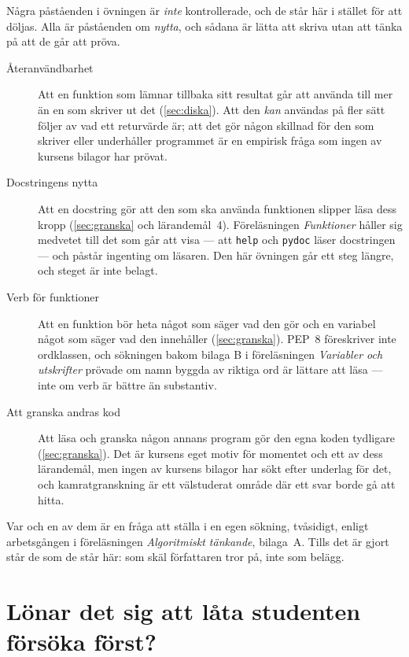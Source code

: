 Några påståenden i övningen är \emph{inte} kontrollerade, och de står
här i stället för att döljas.  Alla är påståenden om \emph{nytta}, och
sådana är lätta att skriva utan att tänka på att de går att pröva.
\begin{description}
  \item[Återanvändbarhet] Att en funktion som lämnar tillbaka sitt
    resultat går att använda till mer än en som skriver ut det
    (\cref{sec:diska}).  Att den \emph{kan} användas på fler sätt följer
    av vad ett returvärde är; att det gör någon skillnad för den som
    skriver eller underhåller programmet är en empirisk fråga som ingen
    av kursens bilagor har prövat.
  \item[Docstringens nytta] Att en docstring gör att den som ska använda
    funktionen slipper läsa dess kropp (\cref{sec:granska}
    och lärandemål~4).
    Föreläsningen \emph{Funktioner} håller sig medvetet till det som går
    att visa --- att \texttt{help} och \texttt{pydoc} läser
    docstringen --- och påstår ingenting om läsaren.  Den här övningen
    går ett steg längre, och steget är inte belagt.
  \item[Verb för funktioner] Att en funktion bör heta något som säger
    vad den gör och en variabel något som säger vad den innehåller
    (\cref{sec:granska}).  PEP~8 föreskriver inte ordklassen, och
    sökningen bakom bilaga B i föreläsningen \emph{Variabler och
    utskrifter} prövade om namn byggda av riktiga ord är lättare att
    läsa --- inte om verb är bättre än substantiv.
  \item[Att granska andras kod] Att läsa och granska någon annans
    program gör den egna koden tydligare (\cref{sec:granska}).  Det är
    kursens eget motiv för momentet och ett av dess lärandemål, men
    ingen av kursens bilagor har sökt efter underlag för det, och
    kamratgranskning är ett välstuderat område där ett svar borde gå att
    hitta.
\end{description}
Var och en av dem är en fråga att ställa i en egen sökning, tvåsidigt,
enligt arbetsgången i föreläsningen \emph{Algoritmiskt tänkande},
bilaga~A.  Tills det är gjort står de som de står här: som skäl
författaren tror på, inte som belägg.

\chapter{Lönar det sig att låta studenten försöka först?}
\label{app:produktivt}


